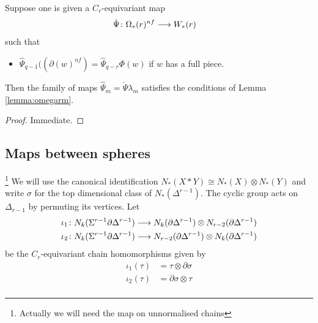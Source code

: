 	\begin{lemma}\label{lemma:omegar} Suppose one is given a $C_r$-equivariant map
		\begin{align*}
			\check{\Psi}\colon \Omega_*(r)^{nf}&\longrightarrow W_*(r)
		\end{align*}
		such that
		\begin{itemize}
			\item $\hat{\Psi}_{q-1}((\partial (w)^{nf}) = \hat{\Psi}_{q-r}\Phi(w)$ if $w$ has a full piece.
		\end{itemize}
		Then the family of maps $\hat{\Psi}_m = \check{\Psi}\lambda_m$ satisfies the conditions of Lemma \ref{lemma:omegarm}.
	\end{lemma}
	\begin{proof}
		Immediate.
	\end{proof}






	\subsection{Maps between spheres}\footnote{Actually we will need the map on unnormalised chains} We will use the canonical identification $N_*(X*Y) \cong N_*(X)\otimes N_*(Y)$ and write $\sigma$ for the top dimensional class of $N_*(\Delta^{r-1})$. The cyclic group acts on $\Delta_{r-1}$ by permuting its vertices. Let
	\begin{align*}
		\iota_1\colon N_k(\Sigma^{r-1}\partial \Delta^{r-1})&\longrightarrow N_{k}(\partial\Delta^{r-1})\otimes N_{r-2}(\partial\Delta^{r-1})\\
		\iota_2\colon N_k(\Sigma^{r-1}\partial \Delta^{r-1})&\longrightarrow N_{r-2}(\partial\Delta^{r-1})\otimes N_{k}(\partial\Delta^{r-1})
	\end{align*}
	be the $C_r$-equivariant chain homomorphisms given by
	\begin{align*}
		\iota_1(\tau) &= \tau\otimes \partial \sigma \\
		\iota_2(\tau) &= \partial \sigma\otimes \tau \\
	\end{align*}

